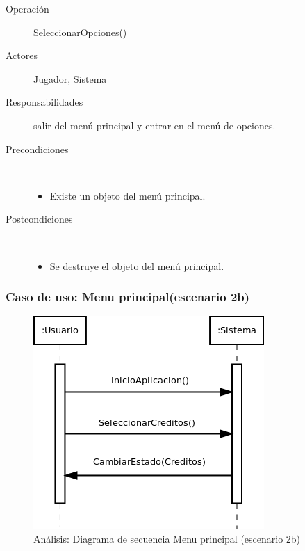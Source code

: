 \begin{description}
    \item [Operación] SeleccionarOpciones()
    \item [Actores] Jugador, Sistema
    \item [Responsabilidades] salir del menú principal y entrar en el menú de opciones.
    \item [Precondiciones] $\quad$
        \begin{itemize}
            \item Existe un objeto del menú principal.
        \end{itemize}
    \item [Postcondiciones] $\quad$
        \begin{itemize}
            \item Se destruye el objeto del menú principal.
        \end{itemize}
\end{description}

\subsubsection{Caso de uso: Menu principal(escenario 2b)}

\begin{figure}[H] 
  \label{secuencia_menu_principal3}
  \begin{center}
    \includegraphics[scale=0.6]{imagenes/analisis/secuencia_menu_principal3.png}
  \end{center}
  \caption{Análisis: Diagrama de secuencia Menu principal (escenario 2b)}
\end{figure}

